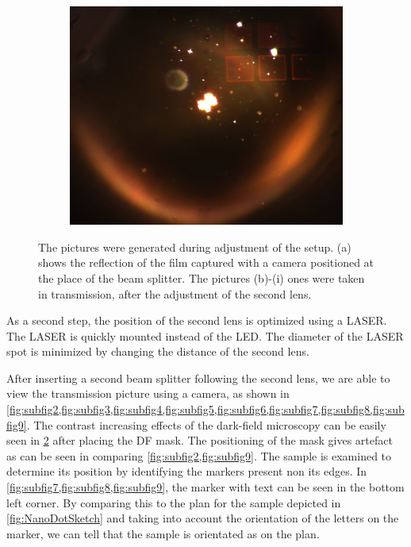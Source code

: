 \begin{figure}[ht]
\begin{subfigure}{0.3\linewidth}
      \includegraphics[width=\linewidth]{data/Gruppe2/image_8.png}
      \caption{}
      \label{fig:subfig9}
    \end{subfigure}
    
    \caption{The pictures were generated during adjustment of the setup. (a) shows the reflection of the film captured with a camera positioned at the place of the beam splitter. The pictures (b)-(i) ones were taken in transmission, after the adjustment of the second lens.}
    \label{fig:subfigure-grid}
\end{figure}

As a second step, the position of the second lens is optimized using a LASER. The LASER is quickly mounted instead of the LED. The diameter of the LASER spot is minimized by changing the distance of the second lens.

After inserting a second beam splitter following the second lens, we are able to view the transmission picture using a camera, as shown in \cref{fig:subfig2,fig:subfig3,fig:subfig4,fig:subfig5,fig:subfig6,fig:subfig7,fig:subfig8,fig:subfig9}. The contrast increasing effects
of the dark-field microscopy can be easily seen in \cref{fig:subfigure-grid} after placing the DF mask. The positioning of the mask gives artefact as can be seen in comparing \cref{fig:subfig2,fig:subfig9}. The sample is examined to determine its position by identifying the markers present non its edges. In \cref{fig:subfig7,fig:subfig8,fig:subfig9}, the marker with text can be seen in the bottom left corner. 
By comparing this to the plan for the sample depicted in \cref{fig:NanoDotSketch} and taking into account the orientation of the 
letters on the marker, we can tell that the sample is orientated as on the plan.
 

